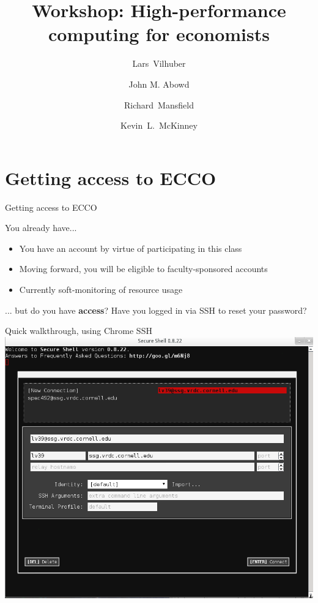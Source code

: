 \documentclass[xcolor=table,compress]{beamer}
\title[Computing for Economists]{Workshop: High-performance computing for economists}
\author[Vilhuber, Abowd, Mansfield, McKinney]{%
  Lars~Vilhuber\inst{1} \and
  John M. Abowd\inst{1} \and
  Richard~Mansfield\inst{1} \and
  Kevin~L.~McKinney %
}
\institute[Cornell]{
  \inst{1}%
   Cornell University, Economics Department,
}%
\begin{document}
\frame{\titlepage}
\section{Getting access to ECCO}


\begin{frame}{Getting access to ECCO}
\begin{block}{You already have...}
\begin{itemize}
\item You have an account by virtue of participating in this class
\item Moving forward, you will be eligible to faculty-sponsored accounts
\item Currently soft-monitoring of resource usage
\end{itemize}
\end{block}
\pause
\begin{block}{... but do you have \textbf{access}?}
Have you logged in via SSH to reset your password? \newline {}
\end{block}
\end{frame}


\begin{frame}{Quick walkthrough, using Chrome SSH}
\includegraphics[width=.9\textwidth]{chrome-ssh-screen1.png}
\end{frame}
\end{document}
